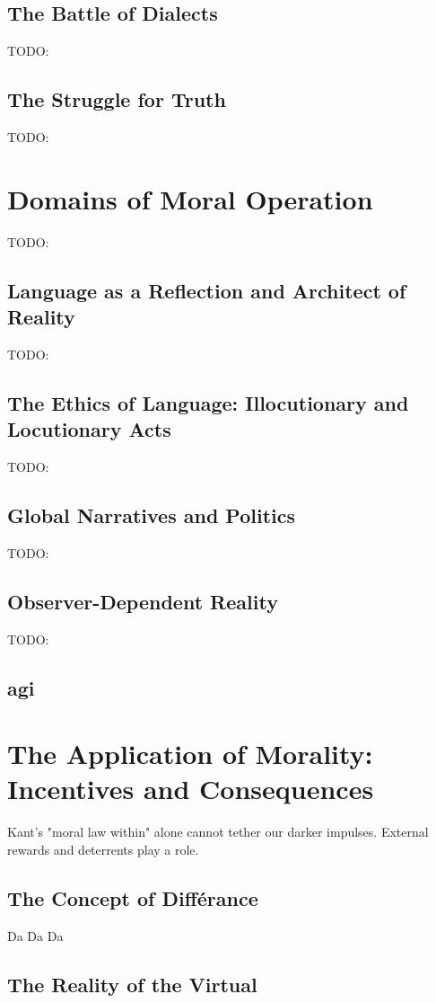 \documentclass[12pt,a4]{article}
\begin{document}
    \subsection{The Battle of Dialects}
    TODO:
    \subsection{The Struggle for Truth}
    TODO:

\section{Domains of Moral Operation}
    TODO:

    \subsection{Language as a Reflection and Architect of Reality}
    TODO:
    \subsection{The Ethics of Language: Illocutionary and Locutionary Acts}
    TODO:
    \subsection{Global Narratives and Politics}
    TODO:
    \subsection{Observer-Dependent Reality}
    TODO:
    \subsection{\ac{agi}}

\section{The Application of Morality: Incentives and Consequences}
    
    Kant's "moral law within" alone cannot tether our darker impulses. External rewards and deterrents play a role.

    \subsection{The Concept of Différance}
    Da Da Da
    \subsection{The Reality of the Virtual}
         
\end{document}
